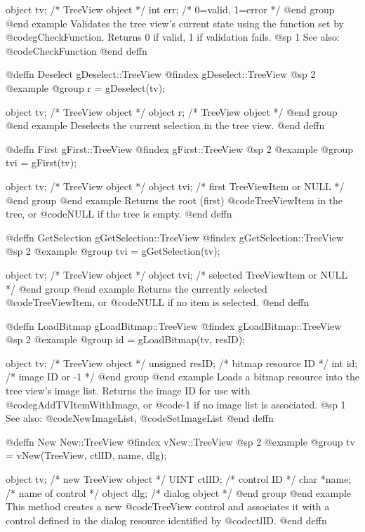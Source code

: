 object  tv;    /*  TreeView object           */
int     err;   /*  0=valid, 1=error          */
@end group
@end example
Validates the tree view's current state using the function set by
@code{gCheckFunction}.  Returns 0 if valid, 1 if validation fails.
@sp 1
See also:  @code{CheckFunction}
@end deffn



@deffn {Deselect} gDeselect::TreeView
@findex gDeselect::TreeView
@sp 2
@example
@group
r = gDeselect(tv);

object  tv;   /*  TreeView object  */
object  r;    /*  TreeView object  */
@end group
@end example
Deselects the current selection in the tree view.
@end deffn



@deffn {First} gFirst::TreeView
@findex gFirst::TreeView
@sp 2
@example
@group
tvi = gFirst(tv);

object  tv;    /*  TreeView object             */
object  tvi;   /*  first TreeViewItem or NULL   */
@end group
@end example
Returns the root (first) @code{TreeViewItem} in the tree, or @code{NULL}
if the tree is empty.
@end deffn



@deffn {GetSelection} gGetSelection::TreeView
@findex gGetSelection::TreeView
@sp 2
@example
@group
tvi = gGetSelection(tv);

object  tv;    /*  TreeView object               */
object  tvi;   /*  selected TreeViewItem or NULL  */
@end group
@end example
Returns the currently selected @code{TreeViewItem}, or @code{NULL} if
no item is selected.
@end deffn



@deffn {LoadBitmap} gLoadBitmap::TreeView
@findex gLoadBitmap::TreeView
@sp 2
@example
@group
id = gLoadBitmap(tv, resID);

object    tv;      /*  TreeView object      */
unsigned  resID;   /*  bitmap resource ID    */
int       id;      /*  image ID or -1       */
@end group
@end example
Loads a bitmap resource into the tree view's image list.  Returns the
image ID for use with @code{gAddTVItemWithImage}, or @code{-1} if no
image list is associated.
@sp 1
See also:  @code{NewImageList}, @code{SetImageList}
@end deffn



@deffn {New} New::TreeView
@findex vNew::TreeView
@sp 2
@example
@group
tv = vNew(TreeView, ctlID, name, dlg);

object    tv;      /*  new TreeView object   */
UINT      ctlID;   /*  control ID            */
char      *name;   /*  name of control       */
object    dlg;     /*  dialog object          */
@end group
@end example
This method creates a new @code{TreeView} control and associates it with
a control defined in the dialog resource identified by @code{ctlID}.
@end deffn



